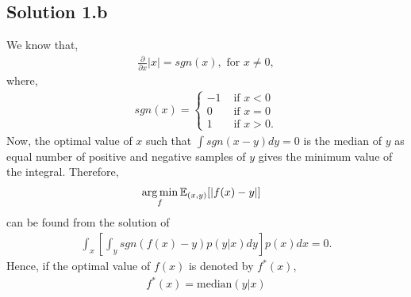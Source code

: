 \subsection*{Solution 1.b}
We know that,
\begin{align*}
	\frac{\partial}{\partial x}|x| = sgn(x), \text{ for } x \neq 0,
\end{align*}
where,
\begin{align*}
	sgn(x) = \begin{cases}
		-1 & \text{ if } x <0\\
		0 & \text{ if } x = 0\\
		1 & \text{ if } x >0.
	\end{cases}
\end{align*}
Now, the optimal value of $x$ such that $\int sgn(x-y)dy=0$ is the median of $y$ as equal number of positive and negative samples of $y$ gives the minimum value of the integral. Therefore,
\begin{align*}
	& \operatorname*{arg\,min}_f \mathbb{E}_{(x,y)}[|f(x)-y|]
\end{align*}
can be found from the solution of
\begin{align*}
	\int_x\left[\int_y sgn(f(x)-y)p(y|x)dy\right]p(x)dx = 0.
\end{align*}
Hence, if the optimal value of $f(x)$ is denoted by $f^*(x)$,
\begin{align*}
	f^*(x) = \text{median}(y|x)
\end{align*}

